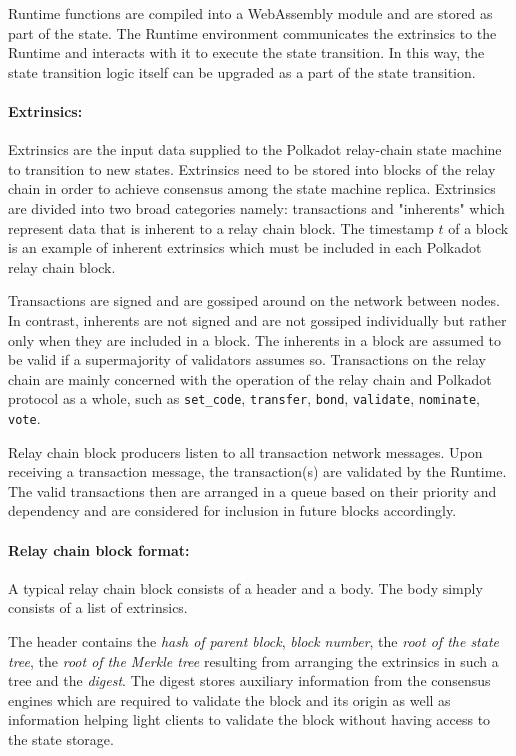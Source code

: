 Runtime functions are compiled into a WebAssembly module and are stored as part of the state. The Runtime environment communicates the extrinsics to the Runtime and interacts with it to execute the state transition. In this way, the state transition logic itself can be upgraded as a part of the state transition.

\paragraph{Extrinsics:} \label{par:extrinsics}

Extrinsics are the input data supplied to the Polkadot relay-chain state machine to transition to new states. Extrinsics need to be stored into blocks of the relay chain in order to achieve consensus among the state machine replica. Extrinsics are divided into two broad categories namely: transactions and "inherents" which represent data that is inherent to a relay chain block. The timestamp $t$ of a block is an example of inherent extrinsics which must be included in each Polkadot relay chain block.

Transactions are signed and are gossiped around on the network between nodes. In contrast, inherents are not signed and are not gossiped individually but rather only when they are included in a block. The inherents in a block are assumed to be valid if a supermajority of validators assumes so.  
Transactions on the relay chain are mainly concerned with the operation of the relay chain and Polkadot protocol as a whole, such as \texttt{set\_code}, \texttt{transfer}, \texttt{bond}, \texttt{validate}, \texttt{nominate}, \texttt{vote}.

Relay chain block producers listen to all transaction network messages. Upon receiving a transaction message, the transaction(s) are validated by the Runtime. The valid transactions then are arranged in a queue based on their priority and dependency and are considered for inclusion in future blocks accordingly.

\paragraph{Relay chain block format:}
A typical relay chain block consists of a header and a body. The body simply consists of a list of extrinsics.

The header contains the \textit{hash of parent block}, \textit{block number}, the \textit{root of the state tree}, the \textit{root of the Merkle tree} resulting from arranging the extrinsics in such a tree and the \textit{digest}. The digest stores auxiliary information from the consensus engines which are required to validate the block and its origin as well as information helping light clients to validate the block without having access to the state storage.

